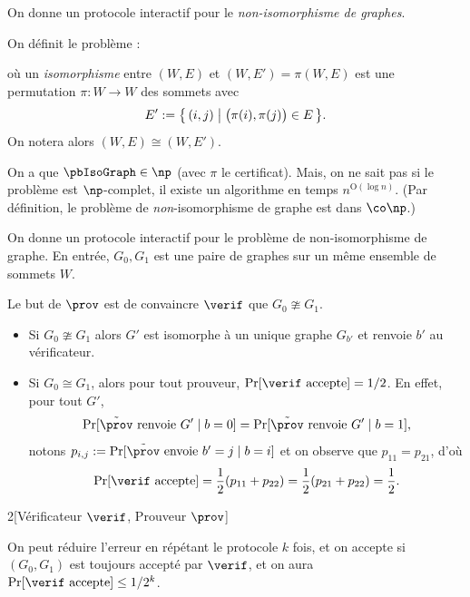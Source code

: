 \documentclass[./main]{subfiles}
\begin{document}
  \begin{exm}
    On donne un protocole interactif pour le \textit{non-isomorphisme de graphes}.

    On définit le problème \pbIsoGraph :
    \showIsoGraph

    où un \textit{isomorphisme} entre $(W, E)$ et $(W, E') = \pi(W, E)$ est une permutation $\pi : W \to W$ des sommets avec
    \[
      E' := \mleft\{\,(i,j) \;\middle|\; \big(\pi(i), \pi(j)\big) \in E\,\mright\} 
    .\]
    On notera alors $(W, E) \cong (W, E')$.

    On a que $\pbIsoGraph \in \np$ (avec $\pi$ le certificat).
    Mais, on ne sait pas si le problème est $\np$-complet, il existe un algorithme en temps $n^{\mathrm{O}(\log n)}$.
    (Par définition, le problème de \textit{non}-isomorphisme de graphe est dans $\conp$.)

    On donne un protocole interactif pour le problème de non-isomorphisme de graphe.
    En entrée, $G_0, G_1$ est une paire de graphes sur un même ensemble de sommets $W$.

    Le but de $\prov$ est de convaincre $\verif$ que $G_0 \ncong G_1$.
    \begin{itemize}
      \item Si $G_0 \ncong G_1$ alors $G'$ est isomorphe à un unique graphe $G_{b'}$ et renvoie $b'$ au vérificateur.
      \item Si $G_0 \cong G_1$, alors pour tout prouveur, $\Pr[\text{$\verif$ accepte}] = 1/2$.
        En effet, pour tout $G'$, 
        \[
          \Pr[\text{$\tilde{\prov}$ renvoie $G'$}  \mid b = 0] = \Pr[\text{$\tilde{\prov}$ renvoie $G'$}  \mid b = 1]
        ,\]
        notons $p_{i,j} := \Pr[\text{$\tilde{\prov}$ envoie $b' = j$}  \mid  b = i]$ et on observe que $p_{11} = p_{21}$, d'où 
        \[
          \Pr[\text{$\verif$ accepte}] = \frac{1}{2} (p_{11} + p_{22}) = \frac{1}{2}(p_{21} + p_{22}) = \frac{1}{2}
        .\]
    \end{itemize}

    \begin{algorithm}[H]
      \caption{Protocole interactif pour $\Sigma^\star \setminus \pbIsoGraph$}
      \begin{paralgo}{2}[Vérificateur $\verif$, Prouveur $\prov$]
        \Else[1]
        \EndIf[1]
        \Else[0]
        \EndIf[0]
      \end{paralgo}
    \end{algorithm}

    On peut réduire l'erreur en répétant le protocole $k$ fois, et on accepte si $(G_0, G_1)$ est toujours accepté par $\verif$, et on aura $\Pr[\text{$\verif$ accepte}] \le 1 / 2^k$.
  \end{exm}
\end{document}
